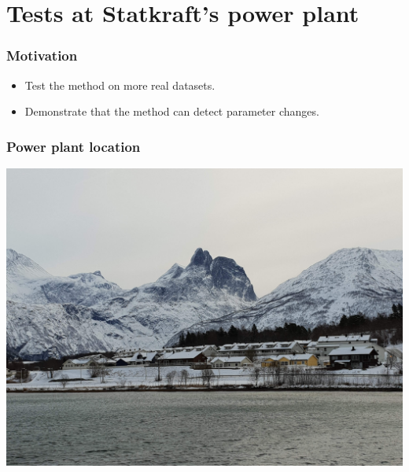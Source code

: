 \section{Tests at Statkraft's power plant}
\begin{frame}
	\frametitle{Motivation}
	\begin{itemize}
		\item Test the method on more real datasets.
		\item Demonstrate that the method can detect parameter changes.
	\end{itemize}
\end{frame}
\begin{frame}
	\frametitle{Power plant location}
	\includegraphics[width=\textwidth]{./pictures/romsdalshorn.jpg}
\end{frame}
